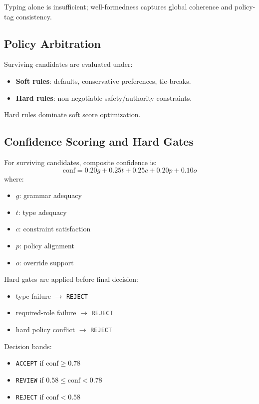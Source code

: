 \documentclass[11pt,a4paper]{article}
\begin{document}
Typing alone is insufficient; well-formedness captures global coherence and policy-tag consistency.

\subsection{Policy Arbitration}
Surviving candidates are evaluated under:
\begin{itemize}[leftmargin=*, itemsep=2pt]
  \item \textbf{Soft rules}: defaults, conservative preferences, tie-breaks.
  \item \textbf{Hard rules}: non-negotiable safety/authority constraints.
\end{itemize}

Hard rules dominate soft score optimization.

\subsection{Confidence Scoring and Hard Gates}
For surviving candidates, composite confidence is:
\[
\mathrm{conf} = 0.20g + 0.25t + 0.25c + 0.20p + 0.10o
\]
where:
\begin{itemize}[leftmargin=*, itemsep=2pt]
  \item $g$: grammar adequacy
  \item $t$: type adequacy
  \item $c$: constraint satisfaction
  \item $p$: policy alignment
  \item $o$: override support
\end{itemize}

Hard gates are applied before final decision:
\begin{itemize}[leftmargin=*, itemsep=2pt]
  \item type failure $\rightarrow$ \texttt{REJECT}
  \item required-role failure $\rightarrow$ \texttt{REJECT}
  \item hard policy conflict $\rightarrow$ \texttt{REJECT}
\end{itemize}

Decision bands:
\begin{itemize}[leftmargin=*, itemsep=2pt]
  \item \texttt{ACCEPT} if $\mathrm{conf} \ge 0.78$
  \item \texttt{REVIEW} if $0.58 \le \mathrm{conf} < 0.78$
  \item \texttt{REJECT} if $\mathrm{conf} < 0.58$
\end{itemize}
\end{document}
